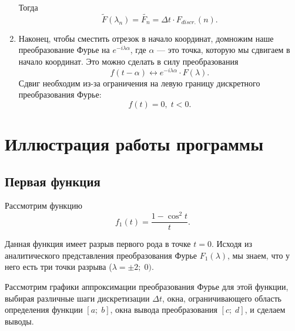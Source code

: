 \documentclass[a4paper, 11pt]{article}
\begin{document}
\begin{enumerate}
            Тогда
            $$
                \widetilde{F}(\lambda_n) = \widetilde{F_n} = \Delta t \cdot F_{discr.}(n).
            $$
        \item
            Наконец, чтобы сместить отрезок в начало координат, домножим наше преобразование Фурье на $e^{-i\lambda \alpha}$, где $\alpha$ --- это точка, которую мы сдвигаем в начало координат. Это можно сделать в силу преобразования
            $$
                f(t-\alpha) \longleftrightarrow e^{-i\lambda\alpha} \cdot F(\lambda).            
            $$
            Сдвиг необходим из-за ограничения на левую границу дискретного преобразования Фурье:
            $$
                f(t) = 0,\; t < 0.            
            $$
    \end{enumerate}
\clearpage
\section{Иллюстрация работы программы}
    \subsection{Первая функция}
    Рассмотрим функцию
    $$
        f_1(t) = \frac{1 - \cos^2t}{t}.    
    $$
    
    Данная функция имеет разрыв первого рода в точке $t = 0$. Исходя из аналитического представления преобразования Фурье $F_1(\lambda)$, мы знаем, что у него есть три точки разрыва ($\lambda = \pm 2; \; 0 )$.
    
    Рассмотрим графики аппроксимации преобразования Фурье для этой функции, выбирая различные шаги дискретизации $\Delta t$, окна, ограничивающего область определения функции $[a;\; b]$, окна вывода преобразования $[c;\; d]$, и сделаем выводы.
    
\end{document}
